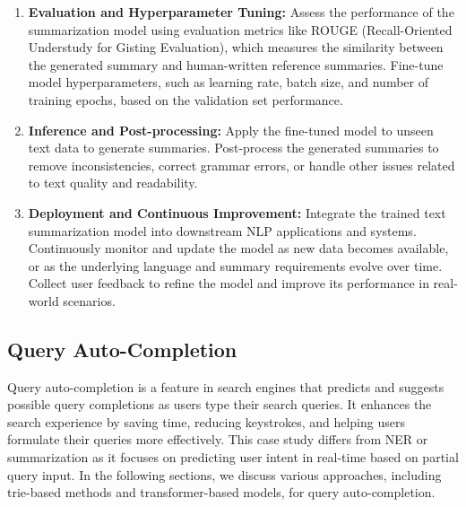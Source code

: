\documentclass[12pt]{article}
\begin{document}
\begin{enumerate}
\item \textbf{Evaluation and Hyperparameter Tuning:} Assess the performance of the summarization model using evaluation metrics like ROUGE (Recall-Oriented Understudy for Gisting Evaluation), which measures the similarity between the generated summary and human-written reference summaries. Fine-tune model hyperparameters, such as learning rate, batch size, and number of training epochs, based on the validation set performance.

\item \textbf{Inference and Post-processing:} Apply the fine-tuned model to unseen text data to generate summaries. Post-process the generated summaries to remove inconsistencies, correct grammar errors, or handle other issues related to text quality and readability.

\item \textbf{Deployment and Continuous Improvement:} Integrate the trained text summarization model into downstream NLP applications and systems. Continuously monitor and update the model as new data becomes available, or as the underlying language and summary requirements evolve over time. Collect user feedback to refine the model and improve its performance in real-world scenarios.

\end{enumerate}


\subsection{Query Auto-Completion}

Query auto-completion is a feature in search engines that predicts and suggests possible query completions as users type their search queries. It enhances the search experience by saving time, reducing keystrokes, and helping users formulate their queries more effectively. This case study differs from NER or summarization as it focuses on predicting user intent in real-time based on partial query input. In the following sections, we discuss various approaches, including trie-based methods and transformer-based models, for query auto-completion.
\end{document}
